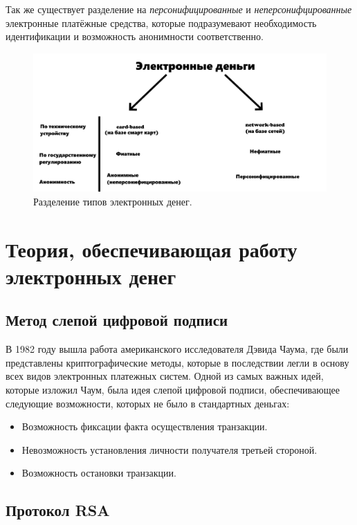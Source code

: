 \documentclass[12pt,a4paper]{article}
\begin{document}
Так же существует разделение на \textit{персонифицированные} и \textit{неперсонифцированные} электронные платёжные средства, которые подразумевают необходимость идентификации и возможность анонимности соответственно.\cite{cite2} 

\begin{figure}[h]
    \centering
    \includegraphics[width=1\textwidth]{pic1}
    \caption{Разделение типов электронных денег.}
    \label{fig:mesh1}
\end{figure}

\section{Теория, обеспечивающая работу электронных денег}

\subsection{Метод слепой цифровой подписи}

В 1982 году вышла работа американского исследователя Дэвида Чаума, где были представлены криптографические методы, которые в последствии легли в основу всех видов электронных платежных систем. Одной из самых важных идей, которые изложил Чаум, была идея слепой цифровой подписи, обеспечивающее следующие возможности, которых не было в стандартных деньгах:

\begin{itemize}
	\item Возможность фиксации факта осуществления транзакции.
	\item Невозможность установления личности получателя третьей стороной.
	\item Возможность остановки транзакции.
\end{itemize}

\subsection{Протокол RSA}
\end{document}
